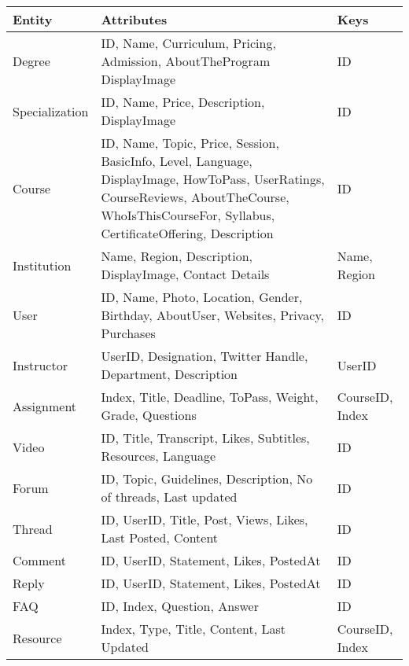 \documentclass[10pt]{article}
\begin{document}
\begin{table}[h!]
  \begin{tabular}{|p{2cm}|p{10cm}|p{3cm}|}
    \hline
    Entity & Attributes & Keys\\
    \hline
    \hline
    Degree & ID, Name, Curriculum, Pricing, Admission, AboutTheProgram DisplayImage& ID\\
    \hline
    Specialization & ID, Name, Price, Description, DisplayImage & ID\\
    \hline
    Course & ID, Name, Topic, Price, Session, BasicInfo, Level, Language, DisplayImage, HowToPass, UserRatings, CourseReviews, AboutTheCourse, WhoIsThisCourseFor, Syllabus, CertificateOffering, Description & ID \\
    \hline
    Institution & Name, Region, Description, DisplayImage, Contact Details & Name, Region\\
    \hline
    User & ID, Name, Photo, Location, Gender, Birthday, AboutUser, Websites, Privacy, Purchases & ID\\
    \hline
    Instructor & UserID, Designation, Twitter Handle, Department, Description & UserID\\
    \hline
    Assignment & Index, Title, Deadline, ToPass, Weight, Grade, Questions & CourseID, Index\\
    \hline
    Video & ID, Title, Transcript, Likes, Subtitles, Resources, Language & ID \\
    \hline
    Forum & ID, Topic, Guidelines, Description, No of threads, Last updated & ID\\
    \hline
    Thread & ID, UserID, Title, Post, Views, Likes, Last Posted, Content & ID\\
    \hline
    Comment & ID, UserID, Statement, Likes, PostedAt & ID\\
    \hline
    Reply & ID, UserID, Statement, Likes, PostedAt & ID\\
    \hline
    FAQ & ID, Index, Question, Answer & ID\\
    \hline
    Resource & Index, Type, Title, Content, Last Updated & CourseID, Index\\
    \hline
  \end{tabular}
\end{table}
\end{document}
